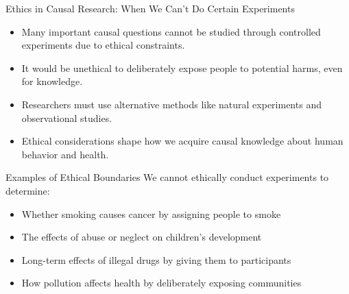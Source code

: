 \documentclass{beamer}
\begin{document}
\begin{frame}{Ethics in Causal Research: When We Can't Do Certain Experiments}
    \begin{itemize}
        \item Many important causal questions cannot be studied through controlled experiments due to ethical constraints.
        \item It would be unethical to deliberately expose people to potential harms, even for knowledge.
        \item Researchers must use alternative methods like natural experiments and observational studies.
        \item Ethical considerations shape how we acquire causal knowledge about human behavior and health.
    \end{itemize}
    
    \begin{block}{Examples of Ethical Boundaries}
        We cannot ethically conduct experiments to determine:
        \begin{itemize}
            \item Whether smoking causes cancer by assigning people to smoke
            \item The effects of abuse or neglect on children's development
            \item Long-term effects of illegal drugs by giving them to participants
            \item How pollution affects health by deliberately exposing communities
        \end{itemize}
    \end{block}
\end{frame}
\end{document}
